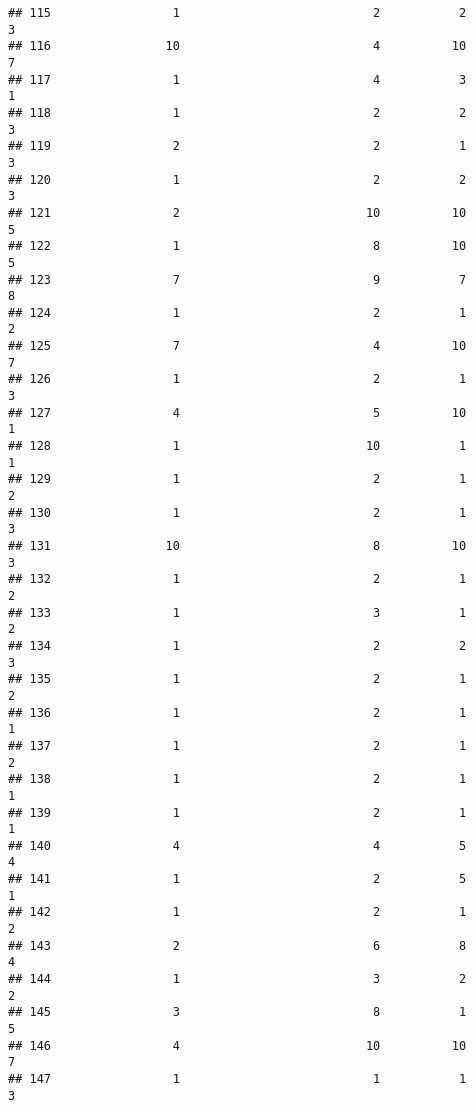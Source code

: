 \documentclass[
]{article}
\begin{document}
\begin{verbatim}
## 115                 1                           2           2               3
## 116                10                           4          10               7
## 117                 1                           4           3               1
## 118                 1                           2           2               3
## 119                 2                           2           1               3
## 120                 1                           2           2               3
## 121                 2                          10          10               5
## 122                 1                           8          10               5
## 123                 7                           9           7               8
## 124                 1                           2           1               2
## 125                 7                           4          10               7
## 126                 1                           2           1               3
## 127                 4                           5          10               1
## 128                 1                          10           1               1
## 129                 1                           2           1               2
## 130                 1                           2           1               3
## 131                10                           8          10               3
## 132                 1                           2           1               2
## 133                 1                           3           1               2
## 134                 1                           2           2               3
## 135                 1                           2           1               2
## 136                 1                           2           1               1
## 137                 1                           2           1               2
## 138                 1                           2           1               1
## 139                 1                           2           1               1
## 140                 4                           4           5               4
## 141                 1                           2           5               1
## 142                 1                           2           1               2
## 143                 2                           6           8               4
## 144                 1                           3           2               2
## 145                 3                           8           1               5
## 146                 4                          10          10               7
## 147                 1                           1           1               3

\end{verbatim}
\end{document}
